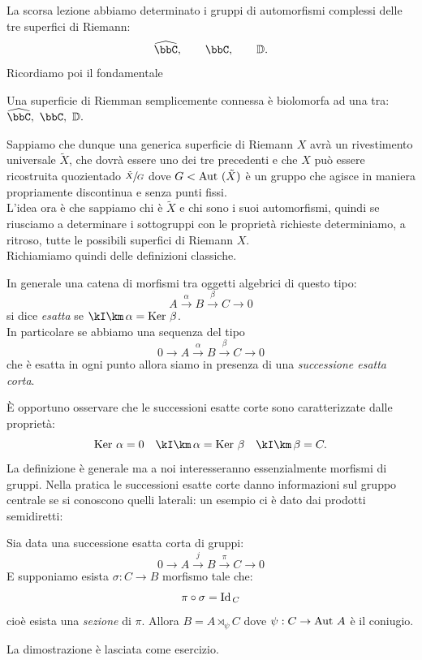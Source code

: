 
La scorsa lezione abbiamo determinato i gruppi di automorfismi complessi delle tre superfici di Riemann:
\[
\hat{\bbC},\qquad \bbC, \qquad \mathbb{D}.
\]
Ricordiamo poi il fondamentale
\begin{teorema}[Riemann] Una superficie di Riemman semplicemente connessa è biolomorfa ad una tra:
$\hat{\bbC},\ \bbC, \ \mathbb{D}. $
\end{teorema}
Sappiamo che dunque una generica superficie di Riemann $X$ avrà un rivestimento universale $\tilde{X}$, che dovrà essere uno dei tre precedenti e che $X$ può essere ricostruita quozientado $\sfrac{\tilde{X}}{G}$ dove $G<\text{Aut }(\tilde{X})$ è un gruppo che agisce in maniera propriamente discontinua e senza punti fissi.\\
L'idea ora è che sappiamo chi è $\tilde{X}$ e chi sono i suoi automorfismi, quindi se riusciamo a determinare i sottogruppi con le proprietà richieste determiniamo, a ritroso, tutte le possibili superfici di Riemann $X$.\\

Richiamiamo quindi delle definizioni classiche.

\begin{definizione} In generale una catena di morfismi tra oggetti algebrici di questo tipo:
\[
A\xrightarrow{\alpha}B\xrightarrow{\beta}C\rightarrow 0
\]
si dice {\it esatta} se $\Im{\alpha}=\Ker{\beta}$.\\
In particolare se abbiamo una sequenza del tipo
\[
0\rightarrow A\xrightarrow{\alpha}B\xrightarrow{\beta}C \rightarrow 0
\]
che è esatta in ogni punto allora siamo in presenza di una {\it successione esatta corta}.
\end{definizione}
È opportuno osservare che le successioni esatte corte sono caratterizzate dalle proprietà:
$$
\Ker \alpha =0 \quad \Im \alpha =\Ker \beta \quad \Im \beta =C.
$$
La definizione è generale ma a noi interesseranno essenzialmente morfismi di gruppi.
Nella pratica le successioni esatte corte danno informazioni sul gruppo centrale se si conoscono quelli laterali: un esempio ci è dato dai prodotti semidiretti:
\begin{fatto}
Sia data una successione esatta corta di gruppi:
$$
0\rightarrow A\xrightarrow{j}B\xrightarrow{\pi}C \rightarrow 0
$$
E supponiamo esista $\sigma:C\rightarrow B$ morfismo tale che:
$$
\pi\circ \sigma=\text{Id}_{\, C} 
$$
cioè esista  una {\it sezione} di $\pi$. Allora $B=A\rtimes_\psi C$ dove $\psi:C
\rightarrow \text{Aut } A$ è il coniugio.
\end{fatto}
La dimostrazione è lasciata come esercizio.

